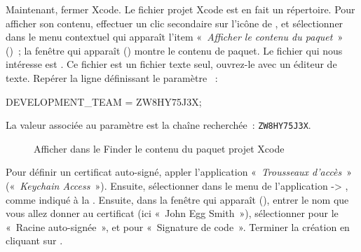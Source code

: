 Maintenant, fermer Xcode. Le fichier projet Xcode  est en fait un répertoire. Pour afficher son contenu, effectuer un clic secondaire sur l'icône de , et sélectionner dans le menu contextuel qui apparaît l'item «~\emph{Afficher le contenu du paquet}~» ()~; la fenêtre qui apparaît () montre le contenu de paquet. Le fichier qui nous intéresse est . Ce fichier est un fichier texte seul, ouvrez-le avec un éditeur de texte. Repérer la ligne définissant le paramètre ~:
\begin{SHELL}
DEVELOPMENT\_TEAM = ZW8HY75J3X;
\end{SHELL}
La valeur associée au paramètre  est la chaîne recherchée~: \texttt{ZW8HY75J3X}.

\begin{figure}[!t]
  \centering
  \hspace{1 cm}
  \caption{Afficher dans le Finder le contenu du paquet projet Xcode}
  \ligne
\end{figure}







Pour définir un certificat auto-signé, appler l'application «~\emph{Trousseaux d'accès}~» («~\emph{Keychain Access}~»). Ensuite, sélectionner dans le menu de l'application  -> , comme indiqué à la . Ensuite, dans la fenêtre qui apparaît (), entrer le nom que vous allez donner au certificat (ici «~John Egg Smith~»), sélectionner pour le  «~Racine auto-signée~», et pour  «~Signature de code~». Terminer la création en cliquant sur .

